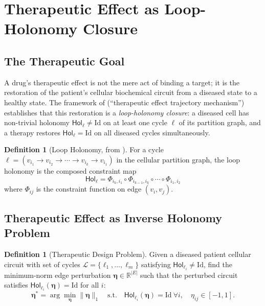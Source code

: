 \documentclass[11pt,twocolumn,a4paper]{article}
\theoremstyle{definition}
\newtheorem{definition}[theorem]{Definition}
\theoremstyle{remark}
\newcommand{\Real}{\mathbb{R}}
\newcommand{\Hol}{\mathsf{Hol}}
\begin{document}
\section{Therapeutic Effect as Loop-Holonomy Closure}
\label{sec:therapeutic}

\subsection{The Therapeutic Goal}

A drug's therapeutic effect is not the mere act of binding a target; it is the restoration of the patient's cellular biochemical circuit from a diseased state to a healthy state. The framework of \citep{sachikonye2025f} (``therapeutic effect trajectory mechanism'') establishes that this restoration is a \emph{loop-holonomy closure}: a diseased cell has non-trivial holonomy $\Hol_\ell \neq \mathrm{Id}$ on at least one cycle $\ell$ of its partition graph, and a therapy restores $\Hol_\ell = \mathrm{Id}$ on all diseased cycles simultaneously.

\begin{definition}[Loop Holonomy, from \citep{sachikonye2025f}]
\label{def:loop_holonomy}
For a cycle $\ell = (v_{i_1} \to v_{i_2} \to \cdots \to v_{i_k} \to v_{i_1})$ in the cellular partition graph, the loop holonomy is the composed constraint map
\begin{equation}
\Hol_\ell = \Phi_{i_k, i_1} \circ \Phi_{i_{k-1}, i_k} \circ \cdots \circ \Phi_{i_1, i_2}
\end{equation}
where $\Phi_{ij}$ is the constraint function on edge $(v_i, v_j)$.
\end{definition}

\subsection{Therapeutic Effect as Inverse Holonomy Problem}

\begin{definition}[Therapeutic Design Problem]
\label{def:therapy_design}
Given a diseased patient cellular circuit with set of cycles $\mathcal{L} = \{\ell_1, \ldots, \ell_m\}$ satisfying $\Hol_{\ell_i} \neq \mathrm{Id}$, find the minimum-norm edge perturbation $\boldsymbol{\eta} \in \Real^{|E|}$ such that the perturbed circuit satisfies $\Hol_{\ell_i}(\boldsymbol{\eta}) = \mathrm{Id}$ for all $i$:
\begin{equation}
\boldsymbol{\eta}^* = \arg\min_{\boldsymbol{\eta}} \|\boldsymbol{\eta}\|_1 \quad \text{s.t.} \quad \Hol_{\ell_i}(\boldsymbol{\eta}) = \mathrm{Id}\ \forall i, \quad \eta_{ij} \in [-1, 1].
\end{equation}
\end{definition}
\end{document}
